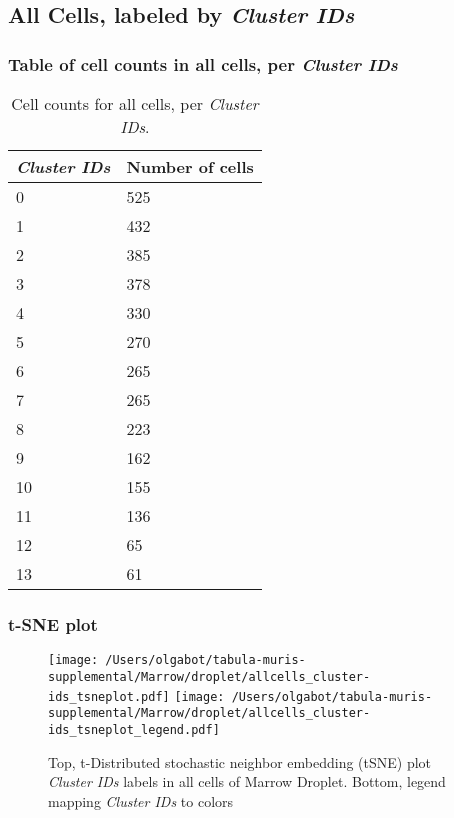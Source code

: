\clearpage

\subsection{All Cells, labeled by \emph{Cluster IDs}}
\subsubsection{Table of cell counts in all cells, per \emph{Cluster IDs}}\begin{table}[h]
\centering
\label{my-label}
\begin{tabular}{@{}ll@{}}
\toprule

\emph{Cluster IDs}& Number of cells \\ \midrule
0 & 525 \\

1 & 432 \\

2 & 385 \\

3 & 378 \\

4 & 330 \\

5 & 270 \\

6 & 265 \\

7 & 265 \\

8 & 223 \\

9 & 162 \\

10 & 155 \\

11 & 136 \\

12 & 65 \\

13 & 61 \\
\bottomrule
\end{tabular}
\caption{Cell counts for all cells, per \emph{Cluster IDs}.}
\end{table}

\clearpage
\subsubsection{t-SNE plot}
\begin{figure}[h]
\centering
\texttt{[image: /Users/olgabot/tabula-muris-supplemental/Marrow/droplet/allcells\_cluster-ids\_tsneplot.pdf]}
\texttt{[image: /Users/olgabot/tabula-muris-supplemental/Marrow/droplet/allcells\_cluster-ids\_tsneplot\_legend.pdf]}
\caption{Top, t-Distributed stochastic neighbor embedding (tSNE) plot  \emph{Cluster IDs} labels in all cells of Marrow Droplet. Bottom, legend mapping \emph{Cluster IDs} to colors}
\end{figure}


